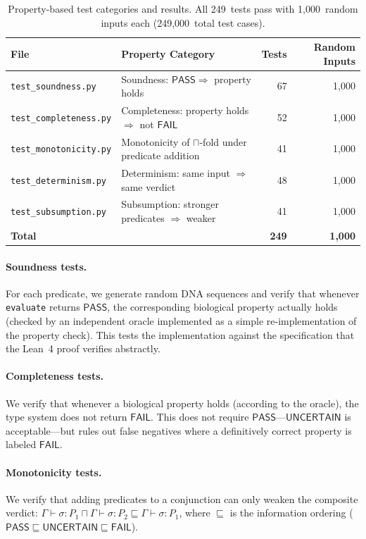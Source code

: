 \documentclass[acmsmall,review,anonymous]{acmart}
\newcommand{\PASS}{\ensuremath{\mathsf{PASS}}\xspace}
\newcommand{\FAIL}{\ensuremath{\mathsf{FAIL}}\xspace}
\newcommand{\UNCERTAIN}{\ensuremath{\mathsf{UNCERTAIN}}\xspace}
\newcommand{\seq}{\sigma}
\newcommand{\pred}{P}
\newcommand{\judg}[3]{#1 \vdash #2 : #3}
\begin{document}
\begin{table}[t]
\centering
\caption{Property-based test categories and results.  All 249~tests
         pass with 1,000~random inputs each (249,000~total test cases).}
\label{tab:pbt-eval}
\begin{tabular}{llrr}
\toprule
\textbf{File} & \textbf{Property Category} & \textbf{Tests} &
  \textbf{Random Inputs} \\
\midrule
\texttt{test\_soundness.py}   & Soundness: $\PASS \Rightarrow$ property holds  & 67  & 1,000 \\
\texttt{test\_completeness.py}& Completeness: property holds $\Rightarrow$ not \FAIL & 52  & 1,000 \\
\texttt{test\_monotonicity.py}& Monotonicity of $\sqcap$-fold under predicate addition & 41  & 1,000 \\
\texttt{test\_determinism.py} & Determinism: same input $\Rightarrow$ same verdict & 48  & 1,000 \\
\texttt{test\_subsumption.py} & Subsumption: stronger predicates $\Rightarrow$ weaker & 41  & 1,000 \\
\midrule
\textbf{Total}                & & \textbf{249} & \textbf{1,000} \\
\bottomrule
\end{tabular}
\end{table}

\paragraph{Soundness tests.}
For each predicate, we generate random DNA sequences and verify that
whenever \texttt{evaluate} returns \PASS, the corresponding biological
property actually holds (checked by an independent oracle implemented
as a simple re-implementation of the property check).  This tests the
implementation against the specification that the Lean~4 proof verifies
abstractly.

\paragraph{Completeness tests.}
We verify that whenever a biological property holds (according to the
oracle), the type system does not return \FAIL.  This does not require
\PASS---\UNCERTAIN{} is acceptable---but rules out false negatives
where a definitively correct property is labeled \FAIL.

\paragraph{Monotonicity tests.}
We verify that adding predicates to a conjunction can only weaken the
composite verdict: $\judg{\Gamma}{\seq}{\pred_1} \sqcap
\judg{\Gamma}{\seq}{\pred_2} \sqsubseteq
\judg{\Gamma}{\seq}{\pred_1}$, where $\sqsubseteq$ is the information
ordering ($\PASS \sqsubseteq \UNCERTAIN \sqsubseteq \FAIL$).
\end{document}
